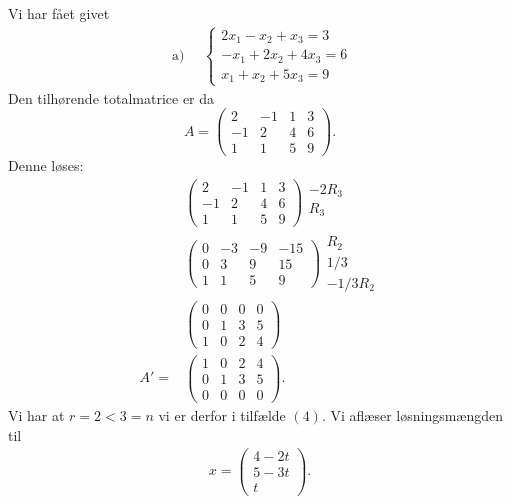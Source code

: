 		Vi har fået givet 
			\begin{align*}
				\text { a) } \quad\left\{\begin{array}{r}{2 x_{1}-x_{2}+x_{3}=3} \\ {-x_{1}+2 x_{2}+4 x_{3}=6} \\ {x_{1}+x_{2}+5 x_{3}=9}\end{array}\right.
			\end{align*}
		Den tilhørende totalmatrice er da
			\begin{equation}
				A=\left(\begin{array}{rrr|r} {2} & {-1} & {1} & {3} \\ {-1} & {2} & {4} & {6} \\ {1} & {1} & {5} & {9} \end{array}\right).
			\end{equation}
		Denne løses:
			\begin{align*}
				&\left(\begin{array}{rrr|r} {2} & {-1} & {1} & {3} \\ {-1} & {2} & {4} & {6} \\ {1} & {1} & {5} & {9} \end{array}\right) \begin{array}{c} -2R_3 \\ R_3 \\ \, \end{array}\\
				&\left(\begin{array}{rrr|r} {0} & {-3} & {-9} & {-15} \\ {0} & {3} & {9} & {15} \\ {1} & {1} & {5} & {9} \end{array}\right) \begin{array}{c} R_2 \\ 1/3 \\ -1/3R_2 \end{array}\\
				&\left(\begin{array}{rrr|r} {0} & {0} & {0} & {0} \\ {0} & {1} & {3} & {5} \\ {1} & {0} & {2} & {4} \end{array}\right)\\
				A'=&\left(\begin{array}{rrr|r}  {1} & {0} & {2} & {4} \\ {0} & {1} & {3} & {5} \\ {0} & {0} & {0} & {0} \end{array}\right).
			\end{align*}
		Vi har at $r=2<3=n$ vi er derfor i tilfælde $(4)$. Vi aflæser løsningsmængden til
			\begin{align*}
				x =\left(\begin{array}{c} 4-2t \\ 5-3t \\ t \end{array}\right).
			\end{align*} 
